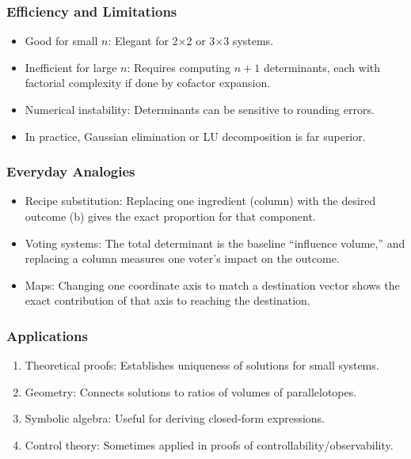 \documentclass[
  letterpaper,
  DIV=11,
  numbers=noendperiod]{scrreprt}
\providecommand{\tightlist}{%
  \setlength{\itemsep}{0pt}\setlength{\parskip}{0pt}}
\begin{document}
\subsubsection{Efficiency and
Limitations}\label{efficiency-and-limitations}

\begin{itemize}
\tightlist
\item
  Good for small \(n\): Elegant for 2×2 or 3×3 systems.
\item
  Inefficient for large \(n\): Requires computing \(n+1\) determinants,
  each with factorial complexity if done by cofactor expansion.
\item
  Numerical instability: Determinants can be sensitive to rounding
  errors.
\item
  In practice, Gaussian elimination or LU decomposition is far superior.
\end{itemize}

\subsubsection{Everyday Analogies}\label{everyday-analogies-55}

\begin{itemize}
\tightlist
\item
  Recipe substitution: Replacing one ingredient (column) with the
  desired outcome (b) gives the exact proportion for that component.
\item
  Voting systems: The total determinant is the baseline ``influence
  volume,'' and replacing a column measures one voter's impact on the
  outcome.
\item
  Maps: Changing one coordinate axis to match a destination vector shows
  the exact contribution of that axis to reaching the destination.
\end{itemize}

\subsubsection{Applications}\label{applications-21}

\begin{enumerate}
\def\labelenumi{\arabic{enumi}.}
\tightlist
\item
  Theoretical proofs: Establishes uniqueness of solutions for small
  systems.
\item
  Geometry: Connects solutions to ratios of volumes of parallelotopes.
\item
  Symbolic algebra: Useful for deriving closed-form expressions.
\item
  Control theory: Sometimes applied in proofs of
  controllability/observability.
\end{enumerate}
\end{document}
